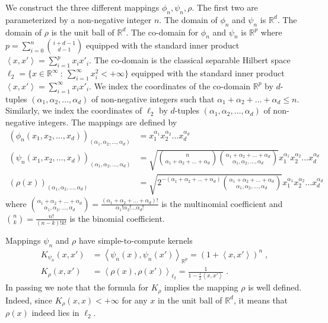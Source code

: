 \documentclass[12pt]{article}
\newcommand{\R}{\mathbb{R}}  %
\newcommand{\ip}[2]{\left\langle #1, #2 \right\rangle} %
\begin{document}
We construct the three different mappings $\phi_n, \psi_n, \rho$. The first two
are parameterized by a non-negative integer $n$. The domain of $\phi_n$ and
$\psi_n$ is $\R^d$. The domain of $\rho$ is the unit ball of $\R^d$. The
co-domain for $\phi_n$ and $\psi_n$ is $\R^p$ where $p = \sum_{i=0}^n
\binom{i+d-1}{d-1}$ equipped with the standard inner product $\ip{x}{x'} =
\sum_{i=1}^p x_i x'_i$. The co-domain is the classical separable Hilbert space
$\ell_2 = \{ x \in \R^\infty ~:~ \sum_{i=1}^\infty x_i^2 < + \infty \}$ equipped
with the standard inner product $\ip{x}{x'} = \sum_{i=1}^\infty x_i x'_i$. We
index the coordinates of the co-domain $\R^p$ by $d$-tuples $(\alpha_1,
\alpha_2, \dots, \alpha_d)$ of non-negative integers such that $\alpha_1 +
\alpha_2 + \dots + \alpha_d \le n$. Similarly, we index the coordinates of
$\ell_2$ by $d$-tuples $(\alpha_1, \alpha_2, \dots, \alpha_d)$ of non-negative
integers. The mappings are defined by
\begin{align*}
\left(\phi_n(x_1, x_2, \dots, x_d)\right)_{(\alpha_1, \alpha_2, \dots, \alpha_d)}
& = x_1^{\alpha_1} x_2^{\alpha_2} \dots x_d^{\alpha_d}
\\
\left(\psi_n(x_1, x_2, \dots, x_d)\right)_{(\alpha_1, \alpha_2, \dots, \alpha_d)}
& = \sqrt{\binom{n}{\alpha_1 + \alpha_2 + \dots + \alpha_d} \binom{\alpha_1 + \alpha_2 + \dots + \alpha_d}{\alpha_1, \alpha_2, \dots, \alpha_d}} x_1^{\alpha_1} x_2^{\alpha_2} \dots x_d^{\alpha_d}
\\
\left(\rho(x)\right)_{(\alpha_1, \alpha_2, \dots, \alpha_d)}
& = \sqrt{2^{-(\alpha_1 + \alpha_2 + \dots + \alpha_d)} \binom{\alpha_1 + \alpha_2 + \dots + \alpha_d}{\alpha_1, \alpha_2, \dots, \alpha_d}} x_1^{\alpha_1} x_2^{\alpha_2} \dots x_d^{\alpha_d}
\end{align*}
where $\binom{\alpha_1 + \alpha_2 + \dots + \alpha_d}{\alpha_1, \alpha_2, \dots, \alpha_d} = \frac{(\alpha_1 + \alpha_2 + \dots + \alpha_d)!}{\alpha_1! \alpha_2! \dots \alpha_d!}$
is the multinomial coefficient and $\binom{n}{k} = \frac{n!}{(n-k)!k!}$ is the binomial coefficient.

Mappings $\psi_n$ and $\rho$ have simple-to-compute kernels
\begin{align*}
K_{\psi_n}(x,x') & = \ip{\psi_n(x)}{\psi_n(x')}_{\R^p} = \left( 1 + \ip{x}{x'} \right)^n \; , \\
K_{\rho}(x,x') & = \ip{\rho(x)}{\rho(x')}_{\ell_2} = \frac{1}{1 - \frac{1}{2}\ip{x}{x'}} \; .
\end{align*}
In passing we note that the formula for $K_\rho$ implies the mapping $\rho$ is
well defined. Indeed, since $K_{\rho}(x,x) < +\infty$ for any $x$ in the unit
ball of $\R^d$, it means that $\rho(x)$ indeed lies in $\ell_2$.
\end{document}
